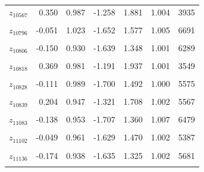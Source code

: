 \begin{longtable}{lrrrrrr}
$z_{10567}$ & 0.350 & 0.987 & -1.258 & 1.881 & 1.004 & 3935\\
\cellcolor{gray!10}{$z_{10795}$} & \cellcolor{gray!10}{-0.030} & \cellcolor{gray!10}{0.976} & \cellcolor{gray!10}{-1.562} & \cellcolor{gray!10}{1.482} & \cellcolor{gray!10}{1.003} & \cellcolor{gray!10}{6672}\\
$z_{10796}$ & -0.051 & 1.023 & -1.652 & 1.577 & 1.005 & 6691\\
\cellcolor{gray!10}{$z_{10804}$} & \cellcolor{gray!10}{-0.058} & \cellcolor{gray!10}{0.979} & \cellcolor{gray!10}{-1.652} & \cellcolor{gray!10}{1.448} & \cellcolor{gray!10}{1.003} & \cellcolor{gray!10}{5490}\\
$z_{10806}$ & -0.150 & 0.930 & -1.639 & 1.348 & 1.001 & 6289\\
\cellcolor{gray!10}{$z_{10809}$} & \cellcolor{gray!10}{-0.088} & \cellcolor{gray!10}{0.971} & \cellcolor{gray!10}{-1.636} & \cellcolor{gray!10}{1.458} & \cellcolor{gray!10}{1.006} & \cellcolor{gray!10}{6318}\\
$z_{10818}$ & 0.369 & 0.981 & -1.191 & 1.937 & 1.001 & 3549\\
\cellcolor{gray!10}{$z_{10824}$} & \cellcolor{gray!10}{-0.049} & \cellcolor{gray!10}{0.981} & \cellcolor{gray!10}{-1.602} & \cellcolor{gray!10}{1.487} & \cellcolor{gray!10}{1.001} & \cellcolor{gray!10}{5786}\\
$z_{10828}$ & -0.111 & 0.989 & -1.700 & 1.492 & 1.000 & 5575\\
\cellcolor{gray!10}{$z_{10838}$} & \cellcolor{gray!10}{-0.040} & \cellcolor{gray!10}{0.991} & \cellcolor{gray!10}{-1.635} & \cellcolor{gray!10}{1.521} & \cellcolor{gray!10}{1.003} & \cellcolor{gray!10}{8158}\\
$z_{10839}$ & 0.204 & 0.947 & -1.321 & 1.708 & 1.002 & 5567\\
\cellcolor{gray!10}{$z_{10891}$} & \cellcolor{gray!10}{-0.179} & \cellcolor{gray!10}{0.979} & \cellcolor{gray!10}{-1.719} & \cellcolor{gray!10}{1.376} & \cellcolor{gray!10}{1.002} & \cellcolor{gray!10}{5509}\\
$z_{11083}$ & -0.138 & 0.953 & -1.707 & 1.360 & 1.007 & 6479\\
\cellcolor{gray!10}{$z_{11087}$} & \cellcolor{gray!10}{-0.009} & \cellcolor{gray!10}{0.958} & \cellcolor{gray!10}{-1.566} & \cellcolor{gray!10}{1.517} & \cellcolor{gray!10}{1.000} & \cellcolor{gray!10}{5733}\\
$z_{11102}$ & -0.049 & 0.961 & -1.629 & 1.470 & 1.002 & 5387\\
\cellcolor{gray!10}{$z_{11124}$} & \cellcolor{gray!10}{-0.039} & \cellcolor{gray!10}{0.955} & \cellcolor{gray!10}{-1.558} & \cellcolor{gray!10}{1.488} & \cellcolor{gray!10}{1.002} & \cellcolor{gray!10}{6451}\\
$z_{11136}$ & -0.174 & 0.938 & -1.635 & 1.325 & 1.002 & 5681\\
\cellcolor{gray!10}{$z_{11147}$} & \cellcolor{gray!10}{-0.009} & \cellcolor{gray!10}{0.976} & \cellcolor{gray!10}{-1.550} & \cellcolor{gray!10}{1.539} & \cellcolor{gray!10}{1.005} & \cellcolor{gray!10}{5439}\\
\bottomrule
\end{longtable}
